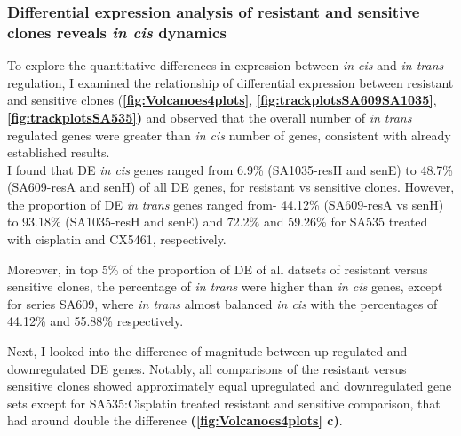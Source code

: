 \subsubsection{Differential expression analysis of resistant and sensitive clones reveals \textit{in cis} dynamics}

To explore the quantitative differences in expression between \textit{in cis} and \textit{in trans} regulation, I examined the relationship of differential expression between resistant and sensitive clones (\textbf{\autoref{fig:Volcanoes4plots}}, \textbf{\autoref{fig:trackplotsSA609SA1035}},  \textbf{\autoref{fig:trackplotsSA535})} and observed that the overall number of \textit{in trans} regulated genes were greater than \textit{in cis} number of genes, consistent with already established results.
\\
 I found that DE \textit{in cis} genes ranged from 6.9\% (SA1035-resH and senE) to 48.7\% (SA609-resA and senH) of all DE genes, for resistant vs sensitive clones. However, the proportion of DE \textit{in trans} genes ranged from- 44.12\% (SA609-resA vs senH) to  93.18\% (SA1035-resH and senE) and  72.2\% and  59.26\% for SA535 treated with cisplatin and CX5461, respectively.

Moreover, in top 5\% of the proportion of \ac{DE} of all datsets of resistant versus sensitive clones, the percentage of \textit{in trans} were higher than \textit{in cis} genes, except for series SA609, where \textit{in trans} almost balanced \textit{in cis} with the percentages of 44.12\% and 55.88\% respectively.

Next, I looked into the difference of magnitude between up regulated and downregulated \ac{DE} genes. Notably, all comparisons of the resistant versus sensitive clones showed approximately equal upregulated and downregulated gene sets except for SA535:Cisplatin treated resistant and sensitive comparison, that had around double the difference \textbf{(\autoref{fig:Volcanoes4plots} c)}.


